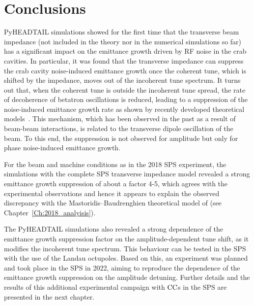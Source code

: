 

\section{Conclusions}\label{sec:Ch7_conclusions}
PyHEADTAIL simulations showed for the first time that the transverse beam impedance (not included in the theory nor in the numerical simulations so far) has a significant impact on the emittance growth driven by RF noise in the crab cavities. In particular, it was found that the transverse impedance can suppress the crab cavity noise-induced emittance growth once the coherent tune, which is shifted by the impedance, moves out of the incoherent tune spectrum. It turns out that, when the coherent tune is outside the incoherent tune spread, the rate of decoherence of betatron oscillations is reduced, leading to a suppression of the noise-induced emittance growth rate as shown by recently developed theoretical models~\cite{Buffat:2022dac, van_kamper_presentation_xavier_theory}. This mechanism, which has been observed in the past as a result of beam-beam interactions, is related to the transverse dipole oscillation of the beam. To this end, the suppression is not observed for amplitude but only for phase noise-induced emittance growth.

For the beam and machine conditions as in the 2018 SPS experiment, the simulations with the complete SPS transverse impedance model revealed a strong emittance growth suppression of about a factor 4-5, which agrees with the experimental observations and hence it appears to explain the observed discrepancy with the Mastoridis--Baudrenghien theoretical model of (see Chapter~\ref{Ch:2018_analyisis}). 

The PyHEADTAIL simulations also revealed a strong dependence of the emittance growth suppression factor on the amplitude-dependent tune shift, as it modifies the incoherent tune spectrum. This behaviour can be tested in the SPS with the use of the Landau octupoles. Based on this, an experiment was planned and took place in the SPS in 2022, aiming to reproduce the dependence of the emittance growth suppression on the amplitude detuning. Further details and the results of this additional experimental campaign with ${\mathrm{CC}}$s in the SPS are presented in the next chapter.




